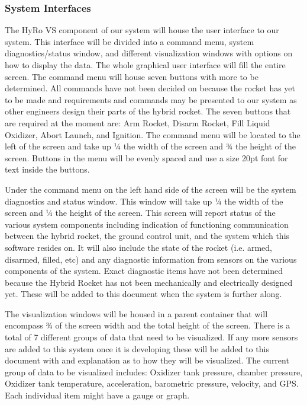 \documentclass[10pt,draftclsnofoot,onecolumn]{IEEEtran}
\begin{document}
\subsubsection{System Interfaces}
The HyRo VS component of our system will house the user interface to our system. This interface will be divided into a command menu, system diagnostics/status window, and different visualization windows with options on how to display the data. The whole graphical user interface will fill the entire screen. The command menu will house seven buttons with more to be determined. All commands have not been decided on because the rocket has yet to be made and requirements and commands may be presented to our system as other engineers design their parts of the hybrid rocket.  The seven buttons that are required at the moment are: Arm Rocket, Disarm Rocket, Fill Liquid Oxidizer, Abort Launch, and Ignition. The command menu will be located to the left of the screen and take up ¼ the width of the screen and ¾ the height of the screen. Buttons in the menu will be evenly spaced and use a size 20pt font for text inside the buttons. \par
	Under the command menu on the left hand side of the screen will be the system diagnostics and status window. This window will take up ¼ the width of the screen and ¼ the height of the screen. This screen will report status of the various system components including indication of functioning communication between the hybrid rocket, the ground control unit, and the system which this software resides on. It will also include the state of the rocket (i.e. armed, disarmed, filled, etc) and any diagnostic information from sensors on the various components of the system. Exact diagnostic items have not been determined because the Hybrid Rocket has not been mechanically and electrically designed yet. These will be added to this document when the system is further along.\par
	The visualization windows will be housed in a parent container that will encompass ¾ of the screen width and the total height of the screen. There is a total of 7 different groups of data that need to be visualized.  If any more sensors are added to this system once it is developing these will be added to this document with and explanation as to how they will be visualized.  The current group of data to be visualized includes:  Oxidizer tank pressure, chamber pressure, Oxidizer tank temperature, acceleration, barometric pressure, velocity, and GPS.   Each individual item might have a gauge or graph.\par
	
\end{document}
